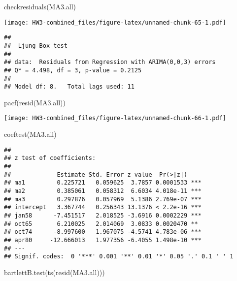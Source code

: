 \documentclass[
]{article}
\newenvironment{Shaded}{\begin{snugshade}}{\end{snugshade}}
\newcommand{\FunctionTok}[1]{\textcolor[rgb]{0.00,0.00,0.00}{#1}}
\newcommand{\NormalTok}[1]{#1}
\begin{document}
\begin{Shaded}
\begin{Highlighting}[]
\FunctionTok{checkresiduals}\NormalTok{(MA3.all)}
\end{Highlighting}
\end{Shaded}

\texttt{[image: HW3-combined\_files/figure-latex/unnamed-chunk-65-1.pdf]}

\begin{verbatim}
## 
##  Ljung-Box test
## 
## data:  Residuals from Regression with ARIMA(0,0,3) errors
## Q* = 4.498, df = 3, p-value = 0.2125
## 
## Model df: 8.   Total lags used: 11
\end{verbatim}

\begin{Shaded}
\begin{Highlighting}[]
\FunctionTok{pacf}\NormalTok{(}\FunctionTok{resid}\NormalTok{(MA3.all))}
\end{Highlighting}
\end{Shaded}

\texttt{[image: HW3-combined\_files/figure-latex/unnamed-chunk-66-1.pdf]}

\begin{Shaded}
\begin{Highlighting}[]
\FunctionTok{coeftest}\NormalTok{(MA3.all)}
\end{Highlighting}
\end{Shaded}

\begin{verbatim}
## 
## z test of coefficients:
## 
##             Estimate Std. Error z value  Pr(>|z|)    
## ma1         0.225721   0.059625  3.7857 0.0001533 ***
## ma2         0.385061   0.058312  6.6034 4.018e-11 ***
## ma3         0.297876   0.057969  5.1386 2.769e-07 ***
## intercept   3.367744   0.256343 13.1376 < 2.2e-16 ***
## jan58      -7.451517   2.018525 -3.6916 0.0002229 ***
## oct65       6.210025   2.014069  3.0833 0.0020470 ** 
## oct74      -8.997600   1.967075 -4.5741 4.783e-06 ***
## apr80     -12.666013   1.977356 -6.4055 1.498e-10 ***
## ---
## Signif. codes:  0 '***' 0.001 '**' 0.01 '*' 0.05 '.' 0.1 ' ' 1
\end{verbatim}

\begin{Shaded}
\begin{Highlighting}[]
\FunctionTok{bartlettB.test}\NormalTok{(}\FunctionTok{ts}\NormalTok{(}\FunctionTok{resid}\NormalTok{(MA3.all)))}
\end{Highlighting}
\end{Shaded}
\end{document}
